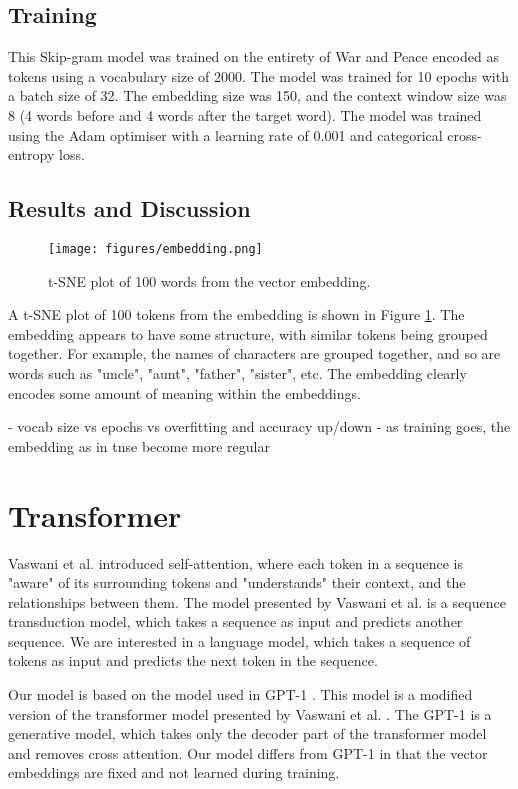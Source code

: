 \documentclass[a4paper, 11pt]{article}
\begin{document}
\subsection{Training}

This Skip-gram model was trained on the entirety of War and Peace encoded as tokens using a vocabulary size of 2000. The model was trained for 10 epochs with a batch size of 32. The embedding size was 150, and the context window size was 8 (4 words before and 4 words after the target word). The model was trained using the Adam optimiser with a learning rate of 0.001 and categorical cross-entropy loss. 

\subsection{Results and Discussion}
\begin{figure}
    \centering
    \texttt{[image: figures/embedding.png]}
    \caption{t-SNE plot of 100 words from the vector embedding.}
    \label{fig:embedding}
\end{figure}

A t-SNE plot of 100 tokens from the embedding is shown in Figure \ref{fig:embedding}. The embedding appears to have some structure, with similar tokens being grouped together. For example, the names of characters are grouped together, and so are words such as "uncle", "aunt", "father", "sister", etc. The embedding clearly encodes some amount of meaning within the embeddings.




- vocab size vs epochs vs overfitting and accuracy up/down
- as training goes, the embedding as in tnse become more regular

 
\section{Transformer}

Vaswani et al. \cite{vaswani2017attention} introduced self-attention, where each token in a sequence is "aware" of its surrounding tokens and "understands" their context, and the relationships between them. The model presented by Vaswani et al. is a sequence transduction model, which takes a sequence as input and predicts another sequence. We are interested in a language model, which takes a sequence of tokens as input and predicts the next token in the sequence.

Our model is based on the model used in GPT-1 \cite{radford2018improving}. This model is a modified version of the transformer model presented by Vaswani et al. \cite{vaswani2017attention}. The GPT-1 is a generative model, which takes only the decoder part of the transformer model and removes cross attention. Our model differs from GPT-1 in that the vector embeddings are fixed and not learned during training.
\end{document}
